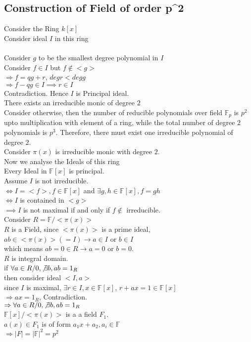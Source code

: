 \documentclass{article}
\begin{document}
\subsection{Construction of Field of order p^2}
Consider the Ring $k[x]$
\\ Consider ideal $I$ in this ring
\\ 
\\  Consider $g$ to be the smallest degree polynomial in $I$
\\ Consider $f \in I$ but $f \not \in <g>$
\\ $\Rightarrow f = qg+ r$, $degr < degg$
\\ $\Rightarrow f-qg \in I \implies r \in I$
\\ Contradiction. Hence $I$ is Principal ideal.
\\  There exists an irreducible monic of degree $2$
\\  Consider otherwise, then the number of reducible polynomials over field $\mathbb{F}_p$ is $p^2$ upto multiplication with element of a ring, while the total number of degree $2$ polynomials is $p^3$. Therefore, there must exist one irreducible polynomial of degree $2$.
\\ Consider $\pi(x)$ is irreducible monic with degree $2$.
\\ Now we analyse the Ideals of this ring
\\ Every Ideal in $\mathbb{F}[x]$ is principal.
\\ Assume $I$ is not irreducible.
\\ $\Leftrightarrow I = <f>, f \in \mathbb{F}[x]$ and $\exists g,h \in \mathbb{F}[x], f = gh$
\\ $\Leftrightarrow I$ is contained in $<g>$
\\ $\implies I $ is not maximal if and only if $f \not \in$ irreducible. 
\\ Consider $R = \mathbb{F}/<\pi(x)>$
\\ $R$ is a Field, since $<\pi(x)>$ is a prime ideal, $ab \in <\pi(x)>(=I) \to a \in I$ or $b \in I$
\\ which means $ab = 0 \in R \to a = 0$ or $b = 0$.
\\ $R$ is integral domain.
\\ if $\forall a \in R/{0} , \not \exists b, ab = 1_R$
\\ then consider ideal $<I,a>$
\\ since $I$ is maximal, $\exists r \in I, x \in \mathbb{F}[x]$, $r + ax = 1 \in \mathbb{F}[x]$
\\ $\Rightarrow ax = 1_R$, Contradiction. 
\\ $\Rightarrow \forall a \in R/{0} , \not \exists b, ab = 1_R$
\\ $\mathbb{F}[x]/<\pi(x)>$ is a  a field $F_1$. 
\\ $a(x) \in F_1$ is of form $a_1x + a_2, a_i \in \mathbb{F}$
\\ $\Rightarrow |F| = |\mathbb{F}|^2 = p^2$
\end{document}
